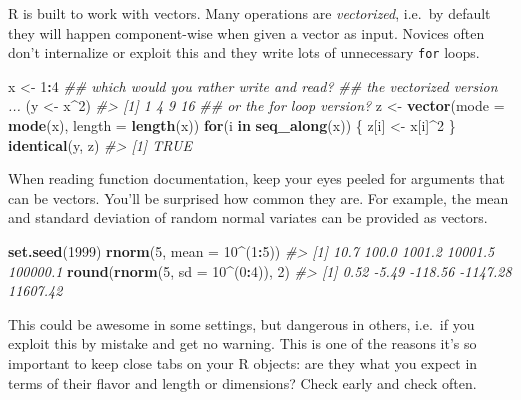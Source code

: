 \documentclass[
]{book}
\newenvironment{Shaded}{\begin{snugshade}}{\end{snugshade}}
\newcommand{\CommentTok}[1]{\textcolor[rgb]{0.56,0.35,0.01}{\textit{#1}}}
\newcommand{\ControlFlowTok}[1]{\textcolor[rgb]{0.13,0.29,0.53}{\textbf{#1}}}
\newcommand{\DataTypeTok}[1]{\textcolor[rgb]{0.13,0.29,0.53}{#1}}
\newcommand{\DecValTok}[1]{\textcolor[rgb]{0.00,0.00,0.81}{#1}}
\newcommand{\KeywordTok}[1]{\textcolor[rgb]{0.13,0.29,0.53}{\textbf{#1}}}
\newcommand{\NormalTok}[1]{#1}
\newcommand{\OperatorTok}[1]{\textcolor[rgb]{0.81,0.36,0.00}{\textbf{#1}}}
\newcommand{\StringTok}[1]{\textcolor[rgb]{0.31,0.60,0.02}{#1}}
\begin{document}
R is built to work with vectors. Many operations are \emph{vectorized}, i.e.~by default they will happen component-wise when given a vector as input. Novices often don't internalize or exploit this and they write lots of unnecessary \texttt{for} loops.

\begin{Shaded}
\begin{Highlighting}[]
\NormalTok{x <-}\StringTok{ }\DecValTok{1}\OperatorTok{:}\DecValTok{4}
\CommentTok{## which would you rather write and read?}
\CommentTok{## the vectorized version ...}
\NormalTok{(y <-}\StringTok{ }\NormalTok{x}\OperatorTok{^}\DecValTok{2}\NormalTok{) }
\CommentTok{#> [1]  1  4  9 16}
\CommentTok{## or the for loop version?}
\NormalTok{z <-}\StringTok{ }\KeywordTok{vector}\NormalTok{(}\DataTypeTok{mode =} \KeywordTok{mode}\NormalTok{(x), }\DataTypeTok{length =} \KeywordTok{length}\NormalTok{(x))}
\ControlFlowTok{for}\NormalTok{(i }\ControlFlowTok{in} \KeywordTok{seq_along}\NormalTok{(x)) \{}
\NormalTok{  z[i] <-}\StringTok{ }\NormalTok{x[i]}\OperatorTok{^}\DecValTok{2}
\NormalTok{\}}
\KeywordTok{identical}\NormalTok{(y, z)}
\CommentTok{#> [1] TRUE}
\end{Highlighting}
\end{Shaded}

When reading function documentation, keep your eyes peeled for arguments that can be vectors. You'll be surprised how common they are. For example, the mean and standard deviation of random normal variates can be provided as vectors.

\begin{Shaded}
\begin{Highlighting}[]
\KeywordTok{set.seed}\NormalTok{(}\DecValTok{1999}\NormalTok{)}
\KeywordTok{rnorm}\NormalTok{(}\DecValTok{5}\NormalTok{, }\DataTypeTok{mean =} \DecValTok{10}\OperatorTok{^}\NormalTok{(}\DecValTok{1}\OperatorTok{:}\DecValTok{5}\NormalTok{))}
\CommentTok{#> [1]     10.7    100.0   1001.2  10001.5 100000.1}
\KeywordTok{round}\NormalTok{(}\KeywordTok{rnorm}\NormalTok{(}\DecValTok{5}\NormalTok{, }\DataTypeTok{sd =} \DecValTok{10}\OperatorTok{^}\NormalTok{(}\DecValTok{0}\OperatorTok{:}\DecValTok{4}\NormalTok{)), }\DecValTok{2}\NormalTok{)}
\CommentTok{#> [1]     0.52    -5.49  -118.56 -1147.28 11607.42}
\end{Highlighting}
\end{Shaded}

This could be awesome in some settings, but dangerous in others, i.e.~if you exploit this by mistake and get no warning. This is one of the reasons it's so important to keep close tabs on your R objects: are they what you expect in terms of their flavor and length or dimensions? Check early and check often.
\end{document}
